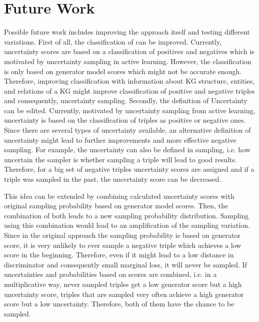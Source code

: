\section{Future Work} 
\label{sec:futurework}
%
Possible future work includes improving the \usgan approach itself and testing different variations.
First of all, the classification of \usgan can be improved.
Currently, uncertainty scores are based on a classification of positives and negatives which is motivated by uncertainty sampling in active learning.
However, the classification is only based on generator model scores which might not be accurate enough.
Therefore, improving classification with information about \ac{KG} structure, entities, and relations of a \ac{KG} might improve classification of positive and negative triples and consequently, uncertainty sampling.
Secondly, the definition of Uncertainty can be edited.
Currently, motivated by uncertainty sampling from active learning, uncertainty is based on the classification of triples as positive or negative ones.
Since there are several types of uncertainty available, an alternative definition of uncertainty might lead to further improvements and more effective negative sampling.
For example, the uncertainty can also be defined in sampling, i.e. how uncertain the sampler is whether sampling a triple will lead to good results.
Therefore, for a big set of negative triples uncertainty scores are assigned and if a triple was sampled in the past, the uncertainty score can be decreased.

This idea can be extended by combining calculated uncertainty scores with original sampling probability based on generator model scores.
Then, the combination of both leads to a new sampling probability distribution.
Sampling using this combination would lead to an amplification of the sampling variation.
Since in the original approach the sampling probability is based on generator score, it is very unlikely to ever sample a negative triple which achieves a low score in the beginning.
Therefore, even if it might lead to a low distance in discriminator and consequently small marginal loss, it will never be sampled.
If uncertainties and probabilities based on scores are combined, i.e. in a multiplicative way, never sampled triples get a low generator score but a high uncertainty score, triples that are sampled very often achieve a high generator score but a low uncertainty.
Therefore, both of them have the chance to be sampled.

